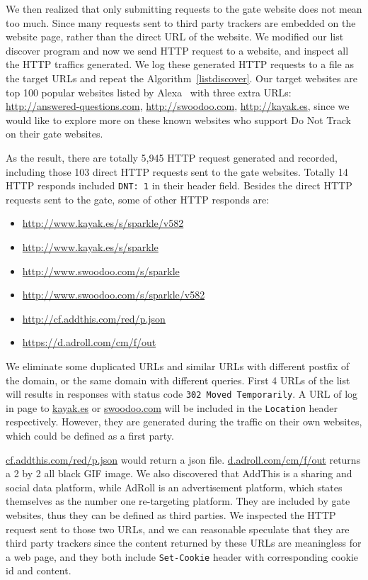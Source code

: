 \documentclass{sig-alternate}
\begin{document}
We then realized that only submitting requests to the gate website does not mean too much. Since many requests sent to third party trackers are embedded on the website page, rather than the direct URL of the website. We modified our list discover program and now we send HTTP request to a website, and inspect all the HTTP traffics generated. We log these generated HTTP requests to a file as the target URLs and repeat the Algorithm~\ref{listdiscover}. Our target websites are top 100 popular websites listed by Alexa~\cite{alexa} with three extra URLs: \url{http://answered-questions.com}, \url{http://swoodoo.com}, \url{http://kayak.es}, since we would like to explore more on these known websites who support Do Not Track on their gate websites.

As the result, there are totally 5,945 HTTP request generated and recorded, including those 103 direct HTTP requests sent to the gate websites. Totally 14 HTTP responds included \verb|DNT: 1| in their header field. Besides the direct HTTP requests sent to the gate, some of other HTTP responds are:

\begin{itemize}
\item \url{http://www.kayak.es/s/sparkle/v582}
\item \url{http://www.kayak.es/s/sparkle}
\item \url{http://www.swoodoo.com/s/sparkle}
\item \url{http://www.swoodoo.com/s/sparkle/v582}
\item \url{http://cf.addthis.com/red/p.json}
\item \url{https://d.adroll.com/cm/f/out}
\end{itemize}

We eliminate some duplicated URLs and similar URLs with different postfix of the domain, or the same domain with different queries. First 4 URLs of the list will results in responses with status code \verb|302 Moved Temporarily|. A URL of log in page to \url{kayak.es} or \url{swoodoo.com} will be included in the \texttt{Location} header respectively. However, they are generated during the traffic on their own websites, which could be defined as a first party.

\url{cf.addthis.com/red/p.json} would return a json file. \url{d.adroll.com/cm/f/out} returns a 2 by 2 all black GIF image. We also discovered that AddThis is a sharing and social data platform, while AdRoll is an advertisement platform, which states themselves as the number one re-targeting platform. They are included by gate websites, thus they can be defined as third parties. We inspected the HTTP request sent to those two URLs, and we can reasonable speculate that they are third party trackers since the content returned by these URLs are meaningless for a web page, and they both include \texttt{Set-Cookie} header with corresponding cookie id and content.
\end{document}
